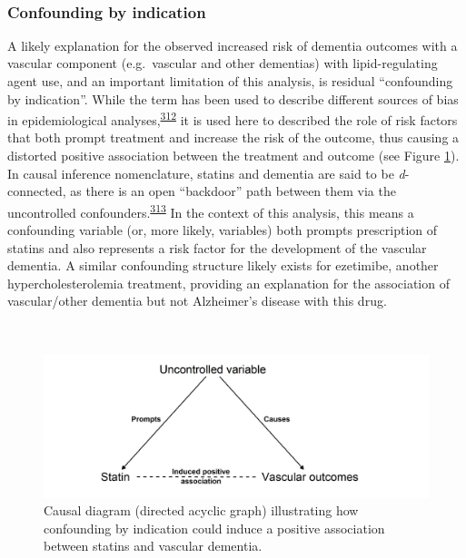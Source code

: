 \documentclass[a4paper, twoside]{templates/ociamthesis}
\begin{document}
~

\hypertarget{cprd-confounding-by-ind}{%
\subsubsection{Confounding by indication}\label{cprd-confounding-by-ind}}

A likely explanation for the observed increased risk of dementia outcomes with a vascular component (e.g.~vascular and other dementias) with lipid-regulating agent use, and an important limitation of this analysis, is residual ``confounding by indication''. While the term has been used to describe different sources of bias in epidemiological analyses,\textsuperscript{\protect\hyperlink{ref-salas1999}{312}} it is used here to described the role of risk factors that both prompt treatment and increase the risk of the outcome, thus causing a distorted positive association between the treatment and outcome (see Figure \ref{fig:indicationBias}). In causal inference nomenclature, statins and dementia are said to be \emph{d}-connected, as there is an open ``backdoor'' path between them via the uncontrolled confounders.\textsuperscript{\protect\hyperlink{ref-suttorp2015}{313}} In the context of this analysis, this means a confounding variable (or, more likely, variables) both prompts prescription of statins and also represents a risk factor for the development of the vascular dementia. A similar confounding structure likely exists for ezetimibe, another hypercholesterolemia treatment, providing an explanation for the association of vascular/other dementia but not Alzheimer's disease with this drug.

~\\




\begin{figure}[H]

{\centering \includegraphics[width=0.8\linewidth]{figures/cprd-analysis/indicationBias} 

}

\caption[Confounding by indication causal diagram]{Causal diagram (directed acyclic graph) illustrating how confounding by indication could induce a positive association between statins and vascular dementia.}\label{fig:indicationBias}
\end{figure}
\end{document}
